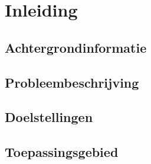 \chapter{Inleiding} %
\label{inleiding}

\section{Achtergrondinformatie} %

\section{Probleembeschrijving} %

\section{Doelstellingen} %

\section{Toepassingsgebied} %


